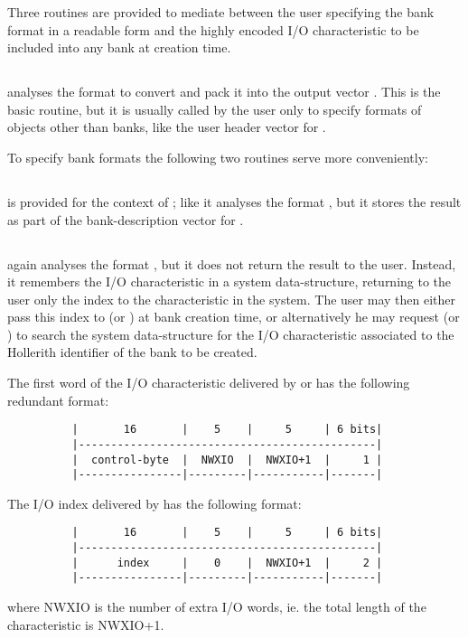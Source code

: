 Three routines are provided to mediate between the user
specifying the bank format in a readable form
and the highly encoded I/O characteristic
to be included into any bank at creation time.

\subsection*{}

analyses the format  to convert and pack it into
the output vector .
This is the basic routine,
but it is usually called by the user only to specify formats
of objects other than banks, like the user header vector for .

To specify bank formats the following two routines serve more
conveniently:

\subsection*{}

is provided for the context of ;
like  it analyses the format ,
but it stores the result as part of the bank-description vector
 for .

\subsection*{}

again analyses the format ,
but it does not return the result to the user.
Instead,
it remembers the I/O characteristic in a system data-structure,
returning to the user only the index to the characteristic
in the system.
The user may then either pass this index to  (or )
at bank creation time,
or alternatively he may request  (or ) to search
the system data-structure for the I/O characteristic
associated to the Hollerith identifier  of the bank to be
created.

The first word of the I/O characteristic delivered by  
or  has the following redundant format:
\begin{verbatim}
          |       16       |    5    |     5     | 6 bits|
          |----------------------------------------------|
          |  control-byte  |  NWXIO  |  NWXIO+1  |     1 |
          |----------------|---------|-----------|-------|

\end{verbatim}
The I/O index delivered by  has the following format:
\begin{verbatim}
          |       16       |    5    |     5     | 6 bits|
          |----------------------------------------------|
          |      index     |    0    |  NWXIO+1  |     2 |
          |----------------|---------|-----------|-------|
\end{verbatim} 
where NWXIO is the number of extra I/O words,
ie. the total length of the characteristic is NWXIO+1.

